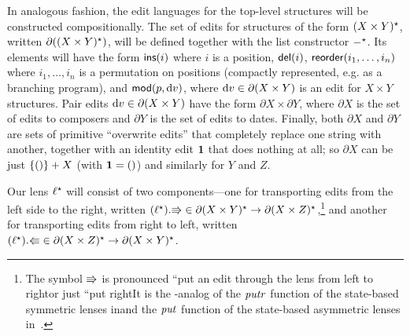 In analogous fashion, the edit languages for the top-level structures will
be constructed compositionally.  The set of edits for structures of the form
$(X \times Y)^\star$, written $\partial ((X \times Y)^\star)$, will be defined
together with the list constructor $-^\star$.  Its elements will have the form
$\mathsf{ins}(i)$ where $i$ is a position, $\mathsf{del}(i)$,
$\mathsf{reorder}(i_1,\ldots,i_n)$ where $i_1,\ldots,i_n$ is a permutation on
positions (compactly represented, e.g. as a branching program),
\iflater{}\fi and $\mathsf{mod}(p,\textrm{d} v)$, where $\textrm{d} v \in
\partial (X\times Y)$ is an edit for $X \times Y$ structures.  Pair edits
$\textrm{d} v \in \partial (X \times Y)$ have the form $\partial X \times
\partial Y$, where $\partial X$ is the set of edits to composers and
$\partial Y$ is the set of edits to dates.  Finally, both $\partial
X$ and $\partial Y$ are sets of primitive ``overwrite edits'' that completely
replace one string with another, together with an identity edit $\mbox{\bf{1}}$
that does nothing at all; so $\partial X$ can be just $\{{()}\} + X$ (with
$\mbox{\bf{1}} = {()}$) and similarly for $Y$ and $Z$.



Our lens $\ell^\star$ will consist of two components---one for transporting edits
from the left side to the right, written $(\ell^\star).\mathord{\Rrightarrow} \in \partial(X
\times Y)^\star \to \partial(X \times Z)^\star$,\footnote{The symbol $\mathord{\Rrightarrow}$ is
  pronounced ``put an edit through the lens from left to right\commaquote or just
  ``put right\dotquote It is the {\edit}-analog of the $\mathit{putr}$ function of the
  state-based symmetric lenses in\symmlenses and the
  $\mathit{put}$ function of the state-based asymmetric lenses
  in~\cite{Focal2005,Boomerang07}.} and another for transporting
edits from right to left, written $(\ell^\star).\mathord{\Lleftarrow} \in \partial(X \times
Z)^\star \to \partial(X \times Y)^\star$.
%

